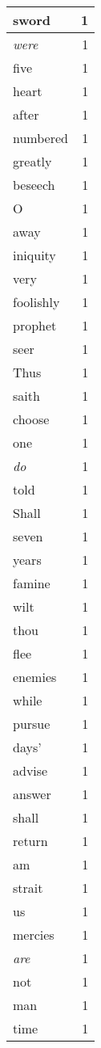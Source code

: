 \begin{center}
\begin{longtable}{l|r}
sword & 1 \\ \hline
\emph{were} & 1 \\ \hline
five & 1 \\ \hline
heart & 1 \\ \hline
after & 1 \\ \hline
numbered & 1 \\ \hline
greatly & 1 \\ \hline
beseech & 1 \\ \hline
O & 1 \\ \hline
away & 1 \\ \hline
iniquity & 1 \\ \hline
very & 1 \\ \hline
foolishly & 1 \\ \hline
prophet & 1 \\ \hline
seer & 1 \\ \hline
Thus & 1 \\ \hline
saith & 1 \\ \hline
choose & 1 \\ \hline
one & 1 \\ \hline
\emph{do} & 1 \\ \hline
told & 1 \\ \hline
Shall & 1 \\ \hline
seven & 1 \\ \hline
years & 1 \\ \hline
famine & 1 \\ \hline
wilt & 1 \\ \hline
thou & 1 \\ \hline
flee & 1 \\ \hline
enemies & 1 \\ \hline
while & 1 \\ \hline
pursue & 1 \\ \hline
days' & 1 \\ \hline
advise & 1 \\ \hline
answer & 1 \\ \hline
shall & 1 \\ \hline
return & 1 \\ \hline
am & 1 \\ \hline
strait & 1 \\ \hline
us & 1 \\ \hline
mercies & 1 \\ \hline
\emph{are} & 1 \\ \hline
not & 1 \\ \hline
man & 1 \\ \hline
time & 1 \\ \hline

\end{longtable}
\end{center}
